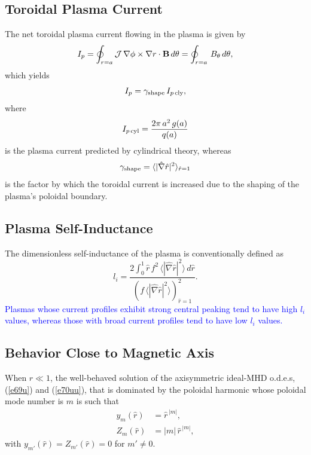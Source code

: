 \documentclass[12pt,prb,aps]{revtex4-1}
\begin{document}
\subsection{Toroidal Plasma Current}
The net toroidal plasma current flowing in the plasma is given by
\begin{equation}\label{ipdef}
I_p = \oint_{r=a}{\cal J}\,\nabla\phi\times\nabla r\cdot{\bf B}\,d\theta = \oint_{r=a}\,B_\theta\,d\theta,
\end{equation}
which yields
\begin{equation}
I_p =\gamma_{\rm shape}\, I_{p\,{\rm cly}},
\end{equation}
where
\begin{equation}
I_{p\,{\rm cyl}} = \frac{2\pi\,a^2\,g(a)}{q(a)}
\end{equation}
is the plasma current predicted by cylindrical theory, whereas
\begin{equation}
\gamma_{\rm shape} = \langle |\hat{\nabla}\hat{r}|^2\rangle_{\hat{r}=1}
\end{equation}
is the factor by which the toroidal  current is increased due to the shaping of the plasma's poloidal
boundary. 

\subsection{Plasma Self-Inductance}\label{sli}
The dimensionless self-inductance of the plasma is conventionally defined as\,\cite{tj}
\begin{equation}
l_i = \frac{2\int_0^1 \hat{r}\,f^2\,\langle |\hat{\nabla}\hat{r}|^2\rangle\,d\hat{r}}{(f\,\langle |\hat{\nabla}\hat{r}|^2\rangle)^2_{\hat{r}=1}}.
\end{equation}
\textcolor{blue}{Plasmas whose current profiles exhibit strong central peaking tend to have high $l_i$ values, whereas those with
broad current profiles tend to have low $l_i$ values. }

\subsection{Behavior Close to Magnetic Axis}\label{axis}
When $\hat{r}\ll 1$, the well-behaved solution of the axisymmetric ideal-MHD o.d.e.s, (\ref{e69u}) and (\ref{e70uu}), that is dominated by the poloidal harmonic whose poloidal mode number is
$m$ is such that
\begin{align}\label{e234g}
y_m(\hat{r}) &= \hat{r}^{\,|m|},\\[0.5ex]
Z_m(\hat{r}) &= |m|\,\hat{r}^{\,|m|},\label{e235g}
\end{align}
with $y_{m'}(\hat{r})=Z_{m'}(\hat{r})=0$ for $m'\neq 0$. 
\end{document}
